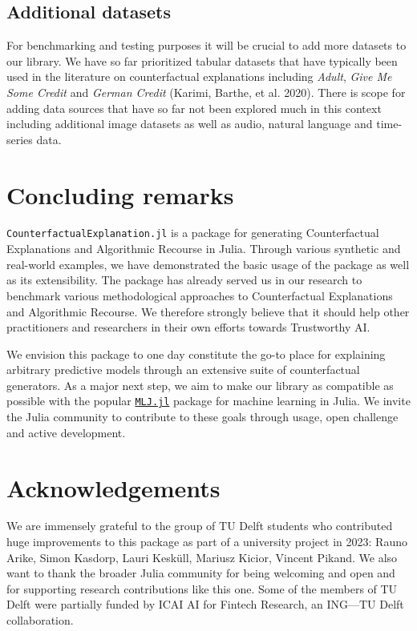 \documentclass{juliacon}
\begin{document}
\subsection{Additional datasets}\label{additional-datasets}

For benchmarking and testing purposes it will be crucial to add more
datasets to our library. We have so far prioritized tabular datasets
that have typically been used in the literature on counterfactual
explanations including \emph{Adult}, \emph{Give Me Some Credit} and
\emph{German Credit} (Karimi, Barthe, et al. 2020). There is scope for
adding data sources that have so far not been explored much in this
context including additional image datasets as well as audio, natural
language and time-series data.

\section{Concluding remarks}\label{sec-conclude}

\texttt{CounterfactualExplanation.jl} is a package for generating
Counterfactual Explanations and Algorithmic Recourse in Julia. Through
various synthetic and real-world examples, we have demonstrated the
basic usage of the package as well as its extensibility. The package has
already served us in our research to benchmark various methodological
approaches to Counterfactual Explanations and Algorithmic Recourse. We
therefore strongly believe that it should help other practitioners and
researchers in their own efforts towards Trustworthy AI.

We envision this package to one day constitute the go-to place for
explaining arbitrary predictive models through an extensive suite of
counterfactual generators. As a major next step, we aim to make our
library as compatible as possible with the popular
\href{https://alan-turing-institute.github.io/MLJ.jl/dev/}{\texttt{MLJ.jl}}
package for machine learning in Julia. We invite the Julia community to
contribute to these goals through usage, open challenge and active
development.

\section{Acknowledgements}\label{sec-ack}

We are immensely grateful to the group of TU Delft students who
contributed huge improvements to this package as part of a university
project in 2023: Rauno Arike, Simon Kasdorp, Lauri Kesküll, Mariusz
Kicior, Vincent Pikand. We also want to thank the broader Julia
community for being welcoming and open and for supporting research
contributions like this one. Some of the members of TU Delft were
partially funded by ICAI AI for Fintech Research, an ING---TU Delft
collaboration.
\end{document}
